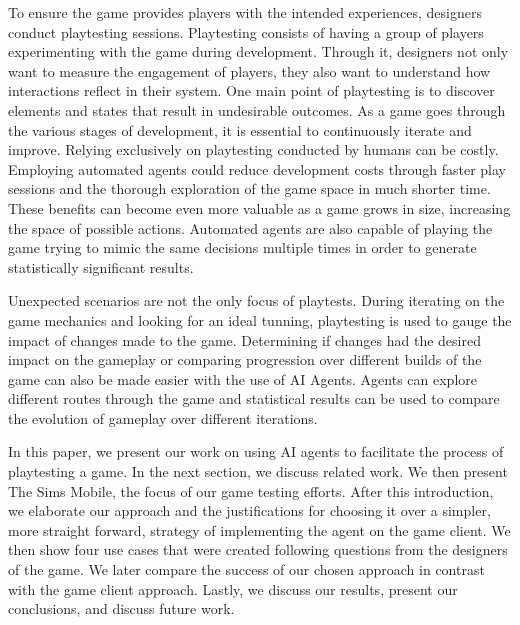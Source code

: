 \documentclass[letterpaper]{article} %
\begin{document}
To ensure the game provides players with the intended experiences, designers conduct playtesting sessions. Playtesting consists of having a group of players experimenting with the game during development. Through it, designers not only want to measure the engagement of players, they  also want to understand how interactions reflect in their system. One main point of playtesting is to discover elements and states that result in undesirable outcomes. As a game goes through the various stages of development, it is essential to continuously iterate and improve. Relying exclusively on playtesting conducted by humans can be costly. Employing automated agents could reduce development costs through faster play sessions and the thorough exploration of the game space in much shorter time. These benefits can become even more valuable as a game grows in size, increasing the space of possible actions. Automated agents are also capable of playing the game trying to mimic the same decisions multiple times in order to generate statistically significant results.

Unexpected scenarios are not the only focus of playtests. During iterating on the game mechanics and looking for an ideal tunning, playtesting is used to gauge the impact of changes made to the game. Determining if changes had the desired impact on the gameplay or comparing progression over different builds of the game can also be made easier with the use of AI Agents. Agents can explore different routes through the game and statistical results can be used to compare the evolution of gameplay over different iterations.

In this paper, we present our work on using AI agents to facilitate the process of playtesting a game.  In the next section, we discuss related work. We then present The Sims Mobile, the focus of our game testing efforts. After this introduction, we elaborate our approach and the justifications for choosing it over a simpler, more straight forward, strategy of implementing the agent on the game client. We then show four use cases that were created following questions from the designers of the game. We later compare the success of our chosen approach in contrast with the game client approach. Lastly, we discuss our results, present our conclusions, and discuss future work.

\end{document}
